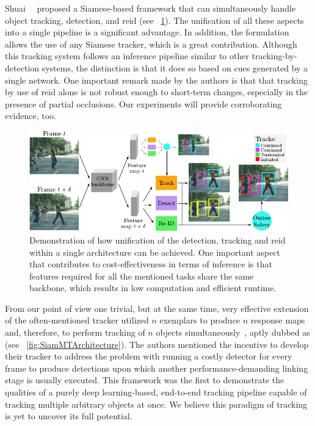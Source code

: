 Shuai~\etal{}~\cite{shuai2020multisiamrcnn} proposed a Siamese-based framework that can simultaneously handle object tracking, detection, and \gls{reid} (see \figtext{}~\ref{fig:MultiSiamRCNN}). The unification of all these aspects into a single pipeline is a significant advantage. In addition, the formulation allows the use of any Siamese tracker, which is a great contribution. Although this tracking system follows an inference pipeline similar to other tracking-by-detection systems, the distinction is that it does so based on cues generated by a single network. One important remark made by the authors is that that tracking by use of \gls{reid} alone is not robust enough to short-term changes, especially in the presence of partial occlusions. Our experiments will provide corroborating evidence, too.

\begin{figure}[!t]
    \centerline{\includegraphics[width=\linewidth]{figures/theoretical_foundations/motsiam_trackrcnn_architecture.pdf}}
    \caption[Siamese \gls{mot} with track R-CNN]{Demonstration of how unification of the detection, tracking and \gls{reid} within a single architecture can be achieved. One important aspect that contributes to cost-effectiveness in terms of inference is that features required for all the mentioned tasks share the same backbone, which results in low
        computation and efficient runtime. }
    \label{fig:MultiSiamRCNN}
\end{figure}

From our point of view one trivial, but at the same time, very effective extension of the often-mentioned \siamfc{} tracker utilized $n$ exemplars to produce $n$ response maps and, therefore, to perform tracking of $n$ objects simultaneously~\cite{vaquero2021siammt}, aptly dubbed as \siammt{} (see \figtext{}~\ref{fig:SiamMTArchitecture}). The authors mentioned the incentive to develop their tracker to address the problem with running a costly detector for every frame to produce detections upon which another performance-demanding linking stage is usually executed. This framework was the first to demonstrate the qualities of a purely deep learning-based, end-to-end tracking pipeline capable of tracking multiple arbitrary objects at once. We believe this paradigm of tracking is yet to uncover its full potential.

